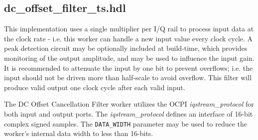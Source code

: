 \documentclass{article}
\def\comp{dc\_offset\_filter\_ts}
\begin{document}
\subsection*{\comp.hdl}
\begin{flushleft}
	This implementation uses a single multiplier per I/Q rail to process input data at the clock rate - i.e. this worker can handle a new input value every clock cycle. A peak detection circuit may be optionally included at build-time, which provides monitoring of the output amplitude, and may be used to influence the input gain. It is recommended to attenuate the input by one bit to prevent overflows; i.e. the input should not be driven more than half-scale to avoid overflow. This filter will produce valid output one clock cycle after each valid input.\medskip

	The DC Offset Cancellation Filter worker utilizes the OCPI \textit{iqstream\_protocol} for both input and output ports. The \textit{iqstream\_protocol} defines an interface of 16-bit complex signed samples. The \verb+DATA_WIDTH+ parameter may be used to reduce the worker's internal data width to less than 16-bits.


\end{flushleft}
\end{document}
